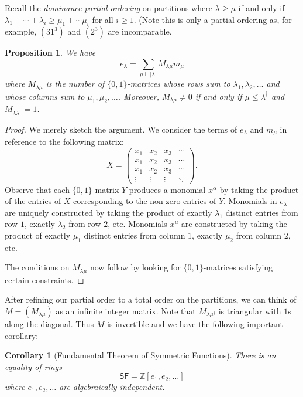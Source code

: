 \documentclass[12pt]{article}
\theoremstyle{plain}
\newtheorem{proposition}[theorem]{Proposition}
\newtheorem{corollary}[theorem]{Corollary}
\theoremstyle{definition}
\theoremstyle{remark}
\numberwithin{equation}{section}
\begin{document}
Recall the \emph{dominance partial ordering} on partitions where $\lambda \ge \mu$
if and only if
$\lambda_1 + \cdots + \lambda_i \ge \mu_1 + \cdots \mu_i$
for all $i \ge 1$.
(Note this is only a partial ordering as, for example, $(31^3)$ and $(2^3)$
are incomparable.

\begin{proposition} \label{prop:01matrix}
We have
\[
e_\lambda = \sum_{\mu \vdash |\lambda|} M_{\lambda \mu} m_\mu
\]
where $M_{\lambda \mu}$ is the number of $\{0,1\}$-matrices whose
rows sum to $\lambda_1,\lambda_2,\ldots$ and whose columns
sum to $\mu_1,\mu_2,\ldots$.
Moreover, $M_{\lambda\mu} \ne 0$ if and only if $\mu \le \lambda^\dag$
and $M_{\lambda\lambda^\dag}=1$.
\end{proposition}

\begin{proof}
We merely sketch the argument.
We consider the terms of $e_\lambda$ and $m_\mu$ in reference to the
following matrix:
\[
X = \begin{pmatrix}
x_1 & x_2 & x_3 & \cdots \\
x_1 & x_2 & x_3 & \cdots \\
x_1 & x_2 & x_3 & \cdots \\
\vdots & \vdots & \vdots & \ddots
\end{pmatrix}.
\]
Observe that each $\{0,1\}$-matrix $Y$ produces a monomial $x^\alpha$
by taking the product of the entries of $X$ corresponding to the
non-zero entries of $Y$.
Monomials in $e_\lambda$ are uniquely constructed by
taking the product of exactly $\lambda_1$ distinct entries from row $1$,
exactly $\lambda_2$ from row $2$, etc.
Monomials $x^\mu$ are constructed by
taking the product of exactly $\mu_1$ distinct entries from column $1$,
exactly $\mu_2$ from column $2$, etc.

The conditions on $M_{\lambda\mu}$ now follow by looking for
$\{0,1\}$-matrices satisfying certain constraints.
\end{proof}

After refining our partial order to a total order
on the partitions, we can think of $M=\left(M_{\lambda\mu}\right)$ as
an infinite integer matrix.
Note that $M_{\lambda\mu^\dag}$ is triangular with $1$s along the diagonal.
Thus $M$ is invertible and we have the following important corollary:

\begin{corollary}[Fundamental Theorem of Symmetric Functions]
There is an equality of rings
\[\mathsf{SF} = \mathbb{Z}[e_1,e_2,\ldots] \]
where $e_1,e_2,\ldots$ are algebraically independent.
\end{corollary}
\end{document}

